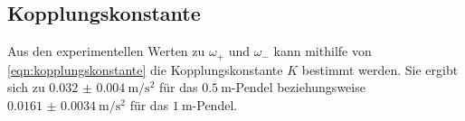 \subsection{Kopplungskonstante}

Aus den experimentellen Werten zu $\omega_+$ und $\omega_-$
kann mithilfe von \autoref{eqn:kopplungskonstante} die Kopplungskonstante $K$ bestimmt werden.
Sie ergibt sich zu
$\SI{0.032(4)}{\meter\per\square\second}$ für das $\SI{0.5}{\meter}$-Pendel
beziehungsweise
$\SI{0.0161(34)}{\meter\per\square\second}$ für das $\SI{1}{\meter}$-Pendel.
